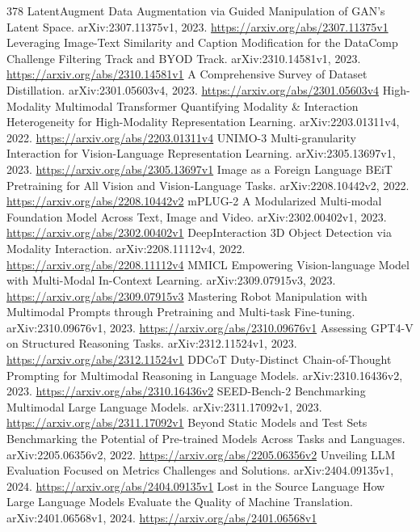 \documentclass[11pt]{article}
\begin{document}
\begin{thebibliography}{378}
 LatentAugment Data Augmentation via Guided Manipulation of GAN's Latent Space. arXiv:2307.11375v1, 2023. \url{https://arxiv.org/abs/2307.11375v1}
 Leveraging Image-Text Similarity and Caption Modification for the DataComp Challenge Filtering Track and BYOD Track. arXiv:2310.14581v1, 2023. \url{https://arxiv.org/abs/2310.14581v1}
 A Comprehensive Survey of Dataset Distillation. arXiv:2301.05603v4, 2023. \url{https://arxiv.org/abs/2301.05603v4}
 High-Modality Multimodal Transformer Quantifying Modality \& Interaction Heterogeneity for High-Modality Representation Learning. arXiv:2203.01311v4, 2022. \url{https://arxiv.org/abs/2203.01311v4}
 UNIMO-3 Multi-granularity Interaction for Vision-Language Representation Learning. arXiv:2305.13697v1, 2023. \url{https://arxiv.org/abs/2305.13697v1}
 Image as a Foreign Language BEiT Pretraining for All Vision and Vision-Language Tasks. arXiv:2208.10442v2, 2022. \url{https://arxiv.org/abs/2208.10442v2}
 mPLUG-2 A Modularized Multi-modal Foundation Model Across Text, Image and Video. arXiv:2302.00402v1, 2023. \url{https://arxiv.org/abs/2302.00402v1}
 DeepInteraction 3D Object Detection via Modality Interaction. arXiv:2208.11112v4, 2022. \url{https://arxiv.org/abs/2208.11112v4}
 MMICL Empowering Vision-language Model with Multi-Modal In-Context Learning. arXiv:2309.07915v3, 2023. \url{https://arxiv.org/abs/2309.07915v3}
 Mastering Robot Manipulation with Multimodal Prompts through Pretraining and Multi-task Fine-tuning. arXiv:2310.09676v1, 2023. \url{https://arxiv.org/abs/2310.09676v1}
 Assessing GPT4-V on Structured Reasoning Tasks. arXiv:2312.11524v1, 2023. \url{https://arxiv.org/abs/2312.11524v1}
 DDCoT Duty-Distinct Chain-of-Thought Prompting for Multimodal Reasoning in Language Models. arXiv:2310.16436v2, 2023. \url{https://arxiv.org/abs/2310.16436v2}
 SEED-Bench-2 Benchmarking Multimodal Large Language Models. arXiv:2311.17092v1, 2023. \url{https://arxiv.org/abs/2311.17092v1}
 Beyond Static Models and Test Sets Benchmarking the Potential of Pre-trained Models Across Tasks and Languages. arXiv:2205.06356v2, 2022. \url{https://arxiv.org/abs/2205.06356v2}
 Unveiling LLM Evaluation Focused on Metrics Challenges and Solutions. arXiv:2404.09135v1, 2024. \url{https://arxiv.org/abs/2404.09135v1}
 Lost in the Source Language How Large Language Models Evaluate the Quality of Machine Translation. arXiv:2401.06568v1, 2024. \url{https://arxiv.org/abs/2401.06568v1}

\end{thebibliography}
\end{document}
